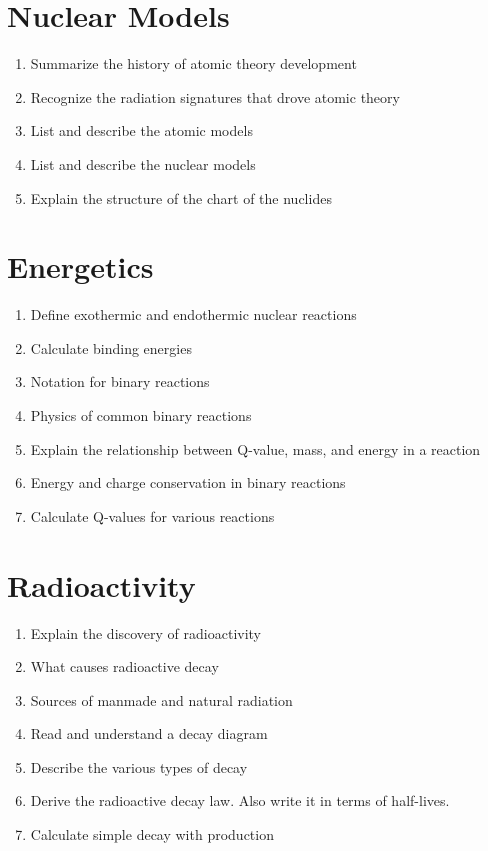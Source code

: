 \documentclass{article}
\begin{document}
\section{Nuclear Models}

\begin{enumerate}
	\item{Summarize the history of atomic theory development}
	\item{Recognize the radiation signatures that drove atomic theory}
	\item{List and describe the atomic models}
	\item{List and describe the nuclear models}
	\item{Explain the structure of the chart of the nuclides}
\end{enumerate}

\section{Energetics}

\begin{enumerate}		
	\item{Define exothermic and endothermic nuclear reactions}
	\item{Calculate binding energies}
	\item{Notation for binary reactions}
	\item{Physics of common binary reactions}
	\item{Explain the relationship between Q-value, mass, and energy in a reaction}
	\item{Energy and charge conservation in binary reactions}
	\item{Calculate Q-values for various reactions} 
\end{enumerate}	

\section{Radioactivity}

\begin{enumerate}
	\item{Explain the discovery of radioactivity}
	\item{What causes radioactive decay}
	\item{Sources of manmade and natural radiation}
	\item{Read and understand a decay diagram}
	\item{Describe the various types of decay}
	\item{Derive the radioactive decay law. Also write it in terms of half-lives.}
	\item{Calculate simple decay with production} 
\end{enumerate}	
\end{document}
